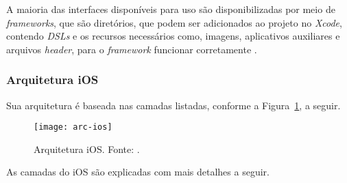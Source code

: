 A maioria das interfaces disponíveis para uso são disponibilizadas por meio de \textit{frameworks}, 
que são diretórios, que podem ser adicionados ao projeto no \textit{Xcode}, contendo \textit{DSLs} e os recursos necessários como, 
imagens, aplicativos auxiliares e arquivos \textit{header}, para o \textit{framework} funcionar corretamente \cite{apple_inc_tech_2014}.

\subsubsection{Arquitetura iOS} \label{subsubsection:arc-ios}
Sua arquitetura é baseada nas camadas listadas, conforme a Figura~\ref{fig:arc-ios}, a seguir.
 
\begin{figure}[H]
  \centering
    \texttt{[image: arc-ios]}
    \caption[Arquitetura iOS]{ Arquitetura iOS. Fonte: \cite{apple_inc_tech_2014}.}
	\label{fig:arc-ios}
\end{figure}

As camadas do iOS são explicadas com mais detalhes a seguir.
 
